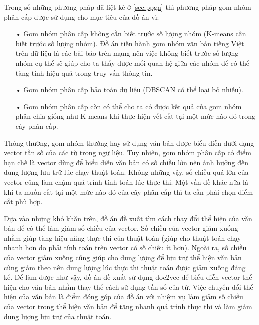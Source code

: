 Trong số những phương pháp đã liệt kê ở \ref{sec:ppgn} thì phương pháp gom nhóm phân cấp được sử dụng cho mục tiêu của đồ án vì:
\begin{enumerate}
\item[•]Gom nhóm phân cấp không cần biết trước số lượng nhóm (K-means cần biết trước số lượng nhóm).
Đồ án tiến hành gom nhóm văn bản tiếng Việt trên dữ liệu là các bài báo trên mạng nên việc không biết trước số lượng nhóm cụ thể sẽ giúp cho ta thấy được mối quan hệ giữa các nhóm để có thể tăng tính hiệu quả trong truy vấn thông tin.
\item[•]Gom nhóm phân cấp bảo toàn dữ liệu (DBSCAN có thể loại bỏ nhiễu).
\item[•]Gom nhóm phân cấp còn có thể cho ta có được kết quả của gom nhóm phân chia giống như K-means khi thực hiện vết cắt tại một mức nào đó trong cây phân cấp.
\end{enumerate}

Thông thường, gom nhóm thường hay sử dụng văn bản được biểu diễn dưới dạng vector tần số của các từ trong ngữ liệu.
Tuy nhiên, gom nhóm phân cấp có điểm hạn chế là vector dùng để biểu diễn văn bản có số chiều lớn nên ảnh hưởng đến dung lượng lưu trữ lúc chạy thuật toán.
Không những vậy, số chiều quá lớn của vector cũng làm chậm quá trình tính toán lúc thực thi.
Một vấn đề khác nữa là khi ta muốn cắt tại một mức nào đó của cây phân cấp thì ta cần phải chọn điểm cắt phù hợp.

Dựa vào những khó khăn trên, đồ án đề xuất tìm cách thay đổi thể hiện của văn bản để có thể làm giảm số chiều của vector.
Số chiều của vector giảm xuống nhằm giúp tăng hiệu năng thực thi của thuật toán (giúp cho thuật toán chạy nhanh hơn do phải tính toán trên vector có số chiều ít hơn).
Ngoài ra, số chiều của vector giảm xuống cũng giúp cho dung lượng để lưu trữ thể hiện văn bản cũng giảm theo nên dung lượng lúc thực thi thuật toán được giảm xuống đáng kể.
Để làm được như vậy, đồ án đề xuất sử dụng doc2vec để biểu diễn vector thể hiện cho văn bản nhằm thay thế cách sử dụng tần số của từ.
Việc chuyển đổi thể hiện của văn bản là điểm đóng góp của đồ án với nhiệm vụ làm giảm số chiều của vector trong thể hiện văn bản để tăng nhanh quá trình thực thi và làm giảm dung lượng lưu trữ của thuật toán.

